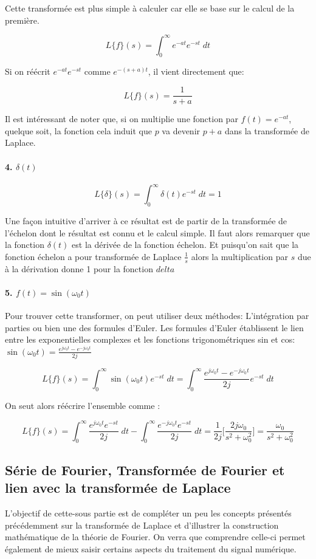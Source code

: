 \documentclass[11pt,a4paper]{article}
\begin{document}
Cette transformée est plus simple à calculer car elle se base sur le calcul de la première.

\[L\{ f \}(s) = \int^{\infty}_{0} e^{-at} e^{-st} \; dt\]

Si on réécrit $e^{-at} e^{-st}$ comme $e^{-(s+a)t}$, il vient directement que: 

\[L\{ f \}(s) = \frac{1}{s+a}\]

Il est intéressant de noter que, si on multiplie une fonction par $f(t) = e^{-at}$, quelque soit, la fonction cela induit que $p$ va devenir $p+a$ dans la transformée de Laplace.

\paragraph{\textbf{4.} $\delta (t)$}
\[L\{ \delta \}(s) = \int^{\infty}_{0} \delta(t) e^{-st} \; dt = 1\] 

Une façon intuitive d'arriver à ce résultat est de partir de la transformée de l'échelon dont le résultat est connu et le calcul simple. Il faut alors remarquer que la fonction $\delta(t)$ est la dérivée de la fonction échelon. Et puisqu'on sait que la fonction échelon a pour transformée de Laplace $\frac{1}{s}$ alors la multiplication par $s$ due à la dérivation donne 1 pour la fonction $delta$

\paragraph{\textbf{5.} $f(t) = \sin(\omega_0 t)$}
Pour trouver cette transformer, on peut utiliser deux méthodes: L'intégration par parties ou bien une des formules d'Euler. Les formules d'Euler établissent le lien entre les exponentielles complexes et les fonctions trigonométriques sin et cos:  $\sin(\omega_0 t) = \frac{e^{j \omega_0 t} - e^{-j \omega_0 t}}{2j}$

\[L\{ f \}(s) = \int^{\infty}_{0} \sin(\omega_0 t) e^{-st} \; dt =  \int^{\infty}_{0} \frac{e^{j \omega_0 t} - e^{-j \omega_0 t}}{2j} e^{-st} \; dt\]

On seut alors réécrire l'ensemble comme :

\[L\{ f \}(s) =  \int^{\infty}_{0} \frac{e^{j \omega_0 t}e^{-st}}{2j}  \; dt - \int^{\infty}_{0} \frac{e^{-j \omega_0 t}e^{-st}}{2j}  \; dt = \frac{1}{2j}\Big[\frac{2j\omega_0}{s^2 + \omega_0^2}  \Big] = \frac{\omega_0}{s^2 + \omega_0^2} \]


\subsection{Série de Fourier, Transformée de Fourier et lien avec la transformée de Laplace}
L'objectif de cette-sous partie est de compléter un peu les concepts présentés précédemment sur la transformée de Laplace et d'illustrer la construction mathématique de la théorie de Fourier. On verra que comprendre celle-ci permet également de mieux saisir certains aspects du traitement du signal numérique.
\end{document}
